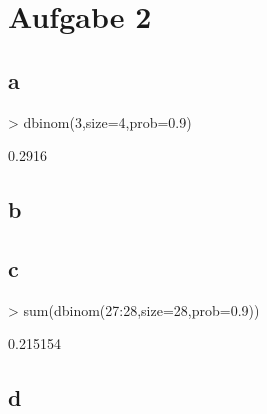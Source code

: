 

\section{Aufgabe 2}

\subsection{a}
\begin{Schunk}
\begin{Sinput}
> dbinom(3,size=4,prob=0.9)
\end{Sinput}
\begin{Soutput}
[1] 0.2916
\end{Soutput}
\end{Schunk}

\subsection{b}


\subsection{c}
\begin{Schunk}
\begin{Sinput}
> sum(dbinom(27:28,size=28,prob=0.9))
\end{Sinput}
\begin{Soutput}
[1] 0.215154
\end{Soutput}
\end{Schunk}

\subsection{d}

